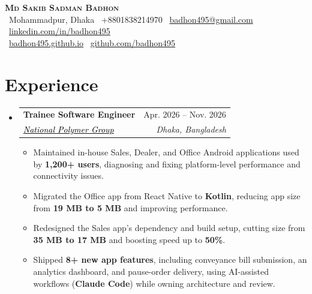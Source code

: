 \documentclass[a4paper]{article}
\makeatletter
\newcommand{\resumeItem}[1]{
  \item\small{
    {#1 \vspace{-2pt}}
  }
}
\newcommand{\resumeSubheading}[4]{
  \vspace{-2pt}\item
    \begin{tabular*}{0.97\textwidth}[t]{l@{\extracolsep{\fill}}r}
      \textbf{#1} & #2 \\
      \textit{\small#3} & \textit{\small #4} \\
    \end{tabular*}\vspace{-7pt}
}
\newcommand{\resumeSubHeadingListStart}{\begin{itemize}[leftmargin=0.15in, label={}]}
\newcommand{\resumeSubHeadingListEnd}{\end{itemize}}
\newcommand{\resumeItemListStart}{\begin{itemize}}
\newcommand{\resumeItemListEnd}{\end{itemize}\vspace{-5pt}}
\makeatother
\begin{document}
\begin{center}
    \textbf{\Huge \scshape Md Sakib Sadman Badhon} \\ \vspace{4pt}
    \faMapMarker*~Mohammadpur, Dhaka \enspace
    ~+8801838214970 \enspace
    \faEnvelope~\href{mailto:badhon495@gmail.com}{badhon495@gmail.com} \enspace
    \faLinkedin~\href{https://linkedin.com/in/badhon495/}{linkedin.com/in/badhon495} \\ \vspace{4pt}
    \faGlobe~\href{https://badhon495.github.io/}{badhon495.github.io} \enspace
    \faGithub~\href{https://github.com/badhon495}{github.com/badhon495} \enspace
\end{center}


\section{Experience}
  \resumeSubHeadingListStart

    \resumeSubheading
      {Trainee Software Engineer}{Apr. 2026 -- Nov. 2026}
      {\href{https://www.nationalpolymer.net/}{\textcolor{black}{National Polymer Group}}}{Dhaka, Bangladesh}
      \resumeItemListStart
      \resumeItem{Maintained in-house Sales, Dealer, and Office Android applications used by \textbf{1,200+ users}, diagnosing and fixing platform-level performance and connectivity issues.}
        \resumeItem{Migrated the Office app from React Native to \textbf{Kotlin}, reducing app size from \textbf{19 MB to 5 MB} and improving performance.}
        \resumeItem{Redesigned the Sales app's dependency and build setup, cutting size from \textbf{35 MB to 17 MB} and boosting speed up to \textbf{50\%}.}
        \resumeItem{Shipped \textbf{8+ new app features}, including conveyance bill submission, an analytics dashboard, and pause-order delivery, using AI-assisted workflows (\textbf{Claude Code}) while owning architecture and review.}
      \resumeItemListEnd

  \resumeSubHeadingListEnd




\end{document}
